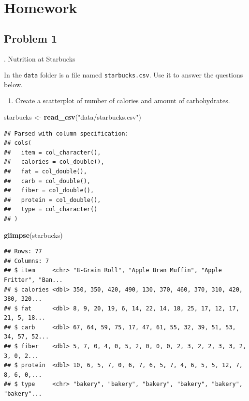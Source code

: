 \documentclass[
]{book}
\newenvironment{Shaded}{\begin{snugshade}}{\end{snugshade}}
\newcommand{\KeywordTok}[1]{\textcolor[rgb]{0.13,0.29,0.53}{\textbf{#1}}}
\newcommand{\NormalTok}[1]{#1}
\newcommand{\StringTok}[1]{\textcolor[rgb]{0.31,0.60,0.02}{#1}}
\providecommand{\tightlist}{%
  \setlength{\itemsep}{0pt}\setlength{\parskip}{0pt}}
\begin{document}
\hypertarget{homework-25}{%
\section{Homework}\label{homework-25}}

\hypertarget{problem-1-25}{%
\subsection{Problem 1}\label{problem-1-25}}

. Nutrition at Starbucks

In the \texttt{data} folder is a file named \texttt{starbucks.csv}. Use it to answer the questions below.

\begin{enumerate}
\def\labelenumi{\alph{enumi}.}
\tightlist
\item
  Create a scatterplot of number of calories and amount of carbohydrates.
\end{enumerate}

\begin{Shaded}
\begin{Highlighting}[]
\NormalTok{starbucks <-}\StringTok{ }\KeywordTok{read_csv}\NormalTok{(}\StringTok{"data/starbucks.csv"}\NormalTok{)}
\end{Highlighting}
\end{Shaded}

\begin{verbatim}
## Parsed with column specification:
## cols(
##   item = col_character(),
##   calories = col_double(),
##   fat = col_double(),
##   carb = col_double(),
##   fiber = col_double(),
##   protein = col_double(),
##   type = col_character()
## )
\end{verbatim}

\begin{Shaded}
\begin{Highlighting}[]
\KeywordTok{glimpse}\NormalTok{(starbucks)}
\end{Highlighting}
\end{Shaded}

\begin{verbatim}
## Rows: 77
## Columns: 7
## $ item     <chr> "8-Grain Roll", "Apple Bran Muffin", "Apple Fritter", "Ban...
## $ calories <dbl> 350, 350, 420, 490, 130, 370, 460, 370, 310, 420, 380, 320...
## $ fat      <dbl> 8, 9, 20, 19, 6, 14, 22, 14, 18, 25, 17, 12, 17, 21, 5, 18...
## $ carb     <dbl> 67, 64, 59, 75, 17, 47, 61, 55, 32, 39, 51, 53, 34, 57, 52...
## $ fiber    <dbl> 5, 7, 0, 4, 0, 5, 2, 0, 0, 0, 2, 3, 2, 2, 3, 3, 2, 3, 0, 2...
## $ protein  <dbl> 10, 6, 5, 7, 0, 6, 7, 6, 5, 7, 4, 6, 5, 5, 12, 7, 8, 6, 0,...
## $ type     <chr> "bakery", "bakery", "bakery", "bakery", "bakery", "bakery"...
\end{verbatim}
\end{document}
